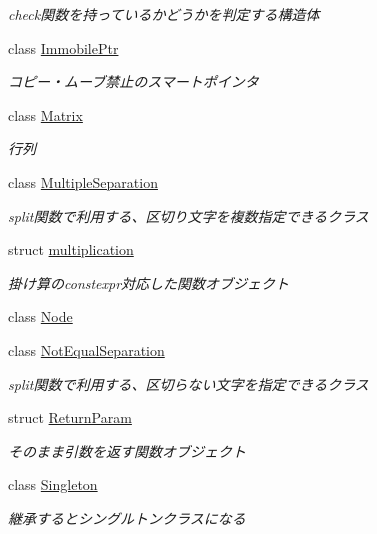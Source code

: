 \begin{DoxyCompactItemize}
\begin{DoxyCompactList}\small\item\em check関数を持っているかどうかを判定する構造体 \end{DoxyCompactList}\item 
class \mbox{\hyperlink{classsaki_1_1_immobile_ptr}{Immobile\+Ptr}}
\begin{DoxyCompactList}\small\item\em コピー・ムーブ禁止のスマートポインタ \end{DoxyCompactList}\item 
class \mbox{\hyperlink{classsaki_1_1_matrix}{Matrix}}
\begin{DoxyCompactList}\small\item\em 行列 \end{DoxyCompactList}\item 
class \mbox{\hyperlink{classsaki_1_1_multiple_separation}{Multiple\+Separation}}
\begin{DoxyCompactList}\small\item\em split関数で利用する、区切り文字を複数指定できるクラス \end{DoxyCompactList}\item 
struct \mbox{\hyperlink{structsaki_1_1multiplication}{multiplication}}
\begin{DoxyCompactList}\small\item\em 掛け算のconstexpr対応した関数オブジェクト \end{DoxyCompactList}\item 
class \mbox{\hyperlink{classsaki_1_1_node}{Node}}
\item 
class \mbox{\hyperlink{classsaki_1_1_not_equal_separation}{Not\+Equal\+Separation}}
\begin{DoxyCompactList}\small\item\em split関数で利用する、区切らない文字を指定できるクラス \end{DoxyCompactList}\item 
struct \mbox{\hyperlink{structsaki_1_1_return_param}{Return\+Param}}
\begin{DoxyCompactList}\small\item\em そのまま引数を返す関数オブジェクト \end{DoxyCompactList}\item 
class \mbox{\hyperlink{classsaki_1_1_singleton}{Singleton}}
\begin{DoxyCompactList}\small\item\em 継承するとシングルトンクラスになる \end{DoxyCompactList}\item 

\end{DoxyCompactItemize}
